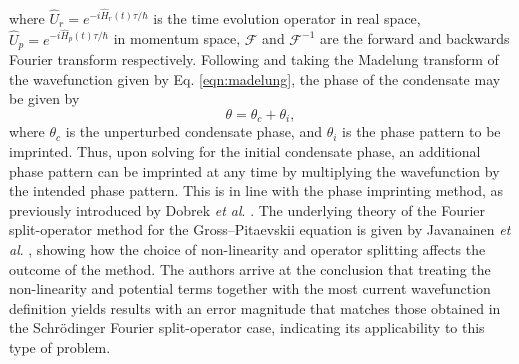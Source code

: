 where $\hat{U}_{r}=e^{-i\hat{H}_{r}(t)\tau/\hbar}$ is the time evolution operator in real space, $\hat{U}_{p}=e^{-i\hat{H}_{p}(t)\tau/\hbar}$ in momentum space,  $\mathscr{F}$ and $\mathscr{F}^{-1}$ are the forward and backwards Fourier transform respectively. Following \cite{BK:Pitaevskii_Stringari_2003} and taking the Madelung transform of the wavefunction given by Eq. \eqref{eqn:madelung}, the phase of the condensate may be given by
\begin{equation}
\theta = \theta_c + \theta_i,
\end{equation}
where $\theta_c$ is the unperturbed condensate phase, and $\theta_i$ is the phase pattern to be imprinted. Thus, upon solving for the initial condensate phase, an additional phase pattern can be imprinted at any time by multiplying the wavefunction by the intended phase pattern. This is in line with the phase imprinting method, as previously introduced by Dobrek \textit{et al}. \cite{Vtx:Dobrek_pra_1999}. The underlying theory of the Fourier split-operator method for the Gross--Pitaevskii equation is given by Javanainen \textit{et al}. \cite{BEC:Javanainen_jphysa_2006}, showing how the choice of non-linearity and operator splitting affects the outcome of the method. The authors arrive at the conclusion that treating the non-linearity and potential terms together with the most current wavefunction definition yields results with an error magnitude that matches those obtained in the Schr\"{o}dinger Fourier split-operator case, indicating its applicability to this type of problem.

